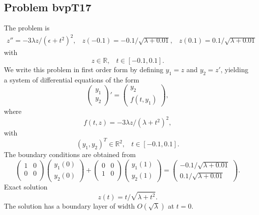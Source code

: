 \documentclass[<options>]{article}
\def \RR {{\mathbb{R}}}
\begin{document}
\subsection{Problem bvpT17}\label{test17}
The problem is 
\begin{eqnarray*}
 z'' =  -3\lambda z / (\epsilon + t^{2})^{2}, \;\;\;z(-0.1) = -0.1 / \sqrt{\lambda + 0.01}, \;\;\; z(0.1) = 0.1 / \sqrt{\lambda + 0.01}
\end{eqnarray*}
with
\[
z \in \RR, \;\;\; t\in [-0.1,0.1].
\]
We write this problem in first order form by defining $y_1=z$ and $y_2=z'$, yielding a system of differential equations of the form
\begin{equation*}
\left(\begin{array}{c}
y_1\\
y_2
\end{array}\right)'=
\left(\begin{array}{c}
y_2\\
f(t,y_1)
\end{array}\right),
\end{equation*}
where
\begin{equation*}
f(t,z) = -3\lambda z / (\lambda + t^{2})^{2},
\end{equation*}
with
\[
(y_1,y_2)^T \in \RR^{2}, \;\;\;  t \in [-0.1,0.1].
\]
The  boundary conditions are obtained from
\begin{equation*}
\left(
  \begin{array}{cc}
    1 & 0 \\
    0 & 0 \\
  \end{array}
\right)
\left(\begin{array}{c}
y_{1}(0)\\
y_{2}(0)
\end{array}\right)
+
\left(
  \begin{array}{cc}
    0 & 0 \\
    1 & 0 \\
  \end{array}
\right)
\left(\begin{array}{c}
y_{1}(1)\\
y_{2}(1)
\end{array}\right)=\left(\begin{array}{c}
-0.1 / \sqrt{\lambda + 0.01}\\
0.1 / \sqrt{\lambda + 0.01}
\end{array}\right).
\end{equation*}
\textrm{Exact solution}
$$z(t) =  t / \sqrt{\lambda + t^{2}}.$$
The solution has a boundary layer of width $O(\sqrt\lambda)$  at $t = 0.$
\end{document}
